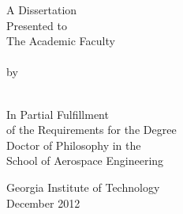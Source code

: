 \thispagestyle{empty}

\begin{center}
  \begin{singlespace}
    {\large\bfseries\MakeUppercase{\thetitle}}
    
    \vfill
    
    A Dissertation\\
    Presented to\\
    The Academic Faculty\\
    \ \\
    by\\
    \ \\
    \theauthor

    \vfill

    In Partial Fulfillment\\
    of the Requirements for the Degree\\
    Doctor of Philosophy in the\\
    School of Aerospace Engineering

    \vfill

    Georgia Institute of Technology\\
    December 2012\\
  \end{singlespace}
\end{center}

